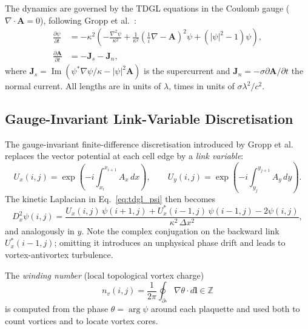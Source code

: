 \documentclass[11pt,a4paper]{article}
\newcommand{\kGL}{\kappa}
\newcommand{\Avec}{\mathbf{A}}
\newcommand{\Jvec}{\mathbf{J}}
\newcommand{\lam}{\lambda}
\begin{document}
The dynamics are governed by the TDGL equations in the Coulomb gauge
($\nabla\cdot\Avec = 0$), following Gropp et al.\ \cite{gropp1996}:
%
\begin{align}
  \frac{\partial\psi}{\partial t}
  &= -\kGL^2\!\left(-\frac{\nabla^2\psi}{\kGL^2}
     + \frac{1}{\kGL^2}\left(\frac{1}{i}\nabla - \Avec\right)^{\!2}\!\psi
     + (|\psi|^2 - 1)\psi\right), \label{eq:tdgl_psi}\\
  \frac{\partial\Avec}{\partial t}
  &= -\Jvec_s - \Jvec_n, \label{eq:tdgl_A}
\end{align}
%
where $\Jvec_s = \operatorname{Im}(\psi^*\nabla\psi/\kGL - |\psi|^2\Avec)$
is the supercurrent and $\Jvec_n = -\sigma\partial\Avec/\partial t$ the normal
current.  All lengths are in units of $\lam$, times in units of
$\sigma\lam^2/c^2$.

\subsection{Gauge-Invariant Link-Variable Discretisation}

The gauge-invariant finite-difference discretisation introduced by
Gropp et al.\ \cite{gropp1996} replaces the vector potential at each cell edge
by a \emph{link variable}:
%
\begin{equation}
  U_x(i,j) = \exp\!\left(-i\!\int_{x_i}^{x_{i+1}} A_x\,dx\right), \qquad
  U_y(i,j) = \exp\!\left(-i\!\int_{y_j}^{y_{j+1}} A_y\,dy\right).
  \label{eq:link}
\end{equation}
%
The kinetic Laplacian in Eq.~\eqref{eq:tdgl_psi} then becomes
%
\begin{equation}
  D^2_{x}\psi(i,j)
    = \frac{U_x(i,j)\,\psi(i{+}1,j) + U_x^*(i{-}1,j)\,\psi(i{-}1,j) - 2\psi(i,j)}{\kGL^2\,\Delta x^2},
  \label{eq:kinetic}
\end{equation}
and analogously in $y$.  Note the complex conjugation on the backward link
$U_x^*(i{-}1,j)$; omitting it introduces an unphysical phase drift and leads
to vortex-antivortex turbulence.

The \emph{winding number} (local topological vortex charge)
%
\begin{equation}
  n_v(i,j) = \frac{1}{2\pi}\oint_{\partial\square}\!\nabla\theta\cdot d\mathbf{l}
  \in \mathbb{Z}
  \label{eq:winding}
\end{equation}
%
is computed from the phase $\theta = \arg\psi$ around each plaquette and used
both to count vortices and to locate vortex cores.

\end{document}
